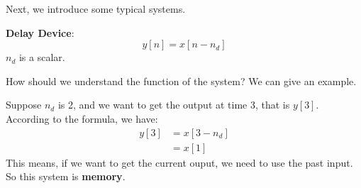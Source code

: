     Next, we introduce some typical systems.

    \textbf{Delay Device}:
        \begin{equation}
            y[n] = x[n-n_d] 
        \end{equation}
    $n_d$ is a scalar.

    How should we understand the function of the system? We can give an example.

    Suppose $n_d$ is 2, and we want to get the output at time 3, that is $y[3]$. 
    According to the formula, we have:
        \begin{equation}
            \begin{aligned}
                y[3] &= x[3-n_d]\\
                     &= x[1]
            \end{aligned}
        \end{equation}
    This means, if we want to get the current ouput, we need to use the past input. 
    So this system is \textbf{memory}. 

